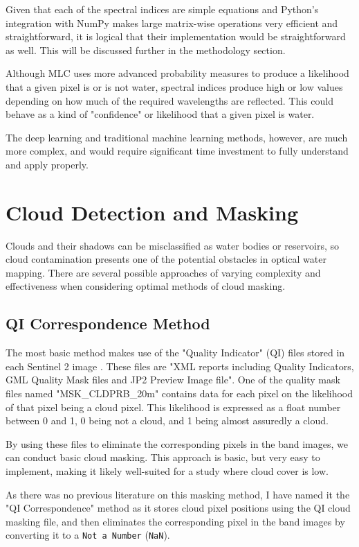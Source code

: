 Given that each of the spectral indices are simple equations and Python's integration with NumPy makes large matrix-wise operations very efficient and straightforward, it is logical that their implementation would be straightforward as well. This will be discussed further in the methodology section. 

Although MLC uses more advanced probability measures to produce a likelihood that a given pixel is or is not water, spectral indices produce high or low values depending on how much of the required wavelengths are reflected. This could behave as a kind of "confidence" or likelihood that a given pixel is water. 

The deep learning and traditional machine learning methods, however, are much more complex, and would require significant time investment to fully understand and apply properly. 

\section{Cloud Detection and Masking}
Clouds and their shadows can be misclassified as water bodies or reservoirs, so cloud contamination presents one of the potential obstacles in optical water mapping. There are several possible approaches of varying complexity and effectiveness when considering optimal methods of cloud masking. 

\subsection{QI Correspondence Method}
The most basic method makes use of the "Quality Indicator" (QI) files stored in each Sentinel 2 image \citep{gatti_bertolini_carriero_2015}. These files are "XML reports including Quality Indicators, GML Quality Mask files and JP2 Preview Image file". One of the quality mask files named "MSK\_CLDPRB\_20m" contains data for each pixel on the likelihood of that pixel being a cloud pixel. This likelihood is expressed as a float number between 0 and 1, 0 being not a cloud, and 1 being almost assuredly a cloud. 

By using these files to eliminate the corresponding pixels in the band images, we can  conduct basic cloud masking. This approach is basic, but very easy to implement, making it likely well-suited for a study where cloud cover is low. 

As there was no previous literature on this masking method, I have named it the "QI Correspondence" method as it stores cloud pixel positions using the QI cloud masking file, and then eliminates the corresponding pixel in the band images by converting it to a \texttt{Not a Number} (\texttt{NaN}).

